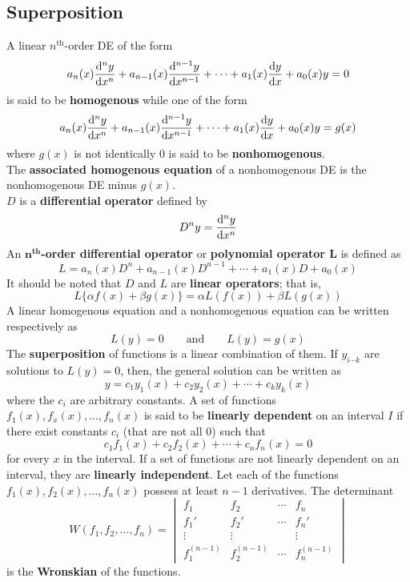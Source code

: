 \documentclass[12pt, A4]{article}
\newcommand{\supt}[2]{#1^{\text{#2}}}
\begin{document}
		\subsection{Superposition}
			A linear \(\supt{n}{th}\)-order DE of the form
				\[a_n(x)\dv[n]{y}{x} + a_{n - 1}(x)\dv[n - 1]{y}{x} + \cdots + a_1(x)\dv{y}{x} + a_0(x)y = 0\]
				is said to be \textbf{homogenous} while one of the form
				\[a_n(x)\dv[n]{y}{x} + a_{n - 1}(x)\dv[n - 1]{y}{x} + \cdots + a_1(x)\dv{y}{x} + a_0(x)y = g(x)\]
				where \(g(x)\) is not identically 0 is said to be \textbf{nonhomogenous}. \\
				The \textbf{associated homogenous equation} of a nonhomogenous DE is the nonhomogenous DE minus \(g(x)\). \\
			\(D\) is a \textbf{differential operator} defined by
				\[D^ny = \dv[n]{y}{x}\]
				An \textbf{\(\bm{\supt{n}{th}}\)-order differential operator} or \textbf{polynomial operator \(\bm{L}\)} is defined as
				\[L = a_n(x)D^n + a_{n - 1}(x)D^{n - 1} + \cdots + a_1(x)D + a_0(x)\]
				It should be noted that \(D\) and \(L\) are \textbf{linear operators}; that is, 
				\[L\{\alpha f(x) + \beta g(x)\} = \alpha L(f(x)) + \beta L(g(x))\]
				A linear homogenous equation and a nonhomogenous equation can be written respectively as
				\[
					L(y) = 0 \qquad \text{and} \qquad
					L(y) = g(x)
				\]
			The \textbf{superposition} of functions is a linear combination of them. If \(y_{i\cdots k}\) are solutions to \(L(y) = 0\), then, the general solution can be written as
				\[y = c_1y_1(x) + c_2y_2(x) + \cdots + c_ky_k(x)\]
				where the \(c_i\) are arbitrary constants.
			A set of functions \(f_1(x), f_x(x), \ldots, f_n(x)\) is said to be \textbf{linearly dependent} on an interval \(I\) if there exist constants \(c_i\) (that are not all 0) such that
				\[c_1f_1(x) + c_2f_2(x) + \cdots + c_nf_n(x) = 0\]
				for every \(x\) in the interval. If a set of functions are not linearly dependent on an interval, they are \textbf{linearly independent}.
			Let each of the functions \(f_1(x), f_2(x), \ldots, f_n(x)\) possess at least \(n - 1\) derivatives. The determinant
				\[
					W(f_1, f_2, \ldots, f_n) = \begin{vmatrix}f_1 & f_2 & \cdots & f_n \\ f_1' & f_2' & \cdots & f_n' \\ \vdots & \vdots && \vdots \\ f_1^{(n - 1)} & f_2^{(n - 1)} & \cdots & f_n^{(n - 1)}\end{vmatrix}
				\]
				is the \textbf{Wronskian} of the functions. \\
\end{document}
